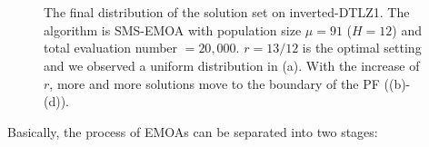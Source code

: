 \documentclass[conference]{IEEEtran}
\begin{document}
\begin{figure}[!t]
  \centering
  \quad
  \\
  \quad
  \\
  \caption{The final distribution of the solution set on inverted-DTLZ1.
  The algorithm is SMS-EMOA with population size $\mu=91$ ($H=12$) and total evaluation number $=20,000$.
  $r=13/12$ is the optimal setting and we observed a uniform distribution in (a).
  With the increase of $r$, more and more solutions move to the boundary of the PF
  ((b)-(d)). 
  }
  \label{dm1}
\end{figure}

%
% 
Basically, the process of EMOAs can be separated into
two stages:
\end{document}
